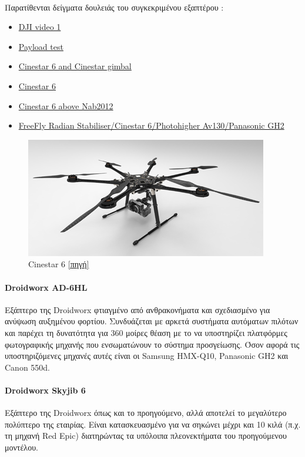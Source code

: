 \documentclass[a4paper, 12pt, twoside]{report}
\begin{document}
{{{{{{			\paragraph{}{Παρατίθενται δείγματα δουλειάς του συγκεκριμένου εξαπτέρου :
				\begin{itemize}
					\item \href{http://www.youtube.com/watch?v=Yo6Wdmt1zSU}{DJI video 1}
					\item \href{http://www.youtube.com/watch?v=t4ZkjpicWuo}{Payload test}
					\item \href{http://www.youtube.com/watch?v=fs1EynZ3E8o}{Cinestar 6 and Cinestar gimbal}
					\item \href{http://www.youtube.com/watch?v=J9hA6OfK9mE}{Cinestar 6}
					\item \href{http://www.youtube.com/watch?v=Bq6r-Ex6z98}{Cinestar 6 above Nab2012}
					\item \href{https://vimeo.com/47171190}{FreeFly Radian Stabiliser/Cinestar 6/Photohigher Av130/Panasonic GH2}
				\end{itemize}
			}
			\begin{figure}[hp]
					\centering
					\includegraphics[scale=0.50]{DJI_S800.png}
					\caption{Cinestar 6 \href{http://www.freeflysystems.com/images/products/cinestar-6-detail.png}{[πηγή]}}
					\label{φωτ:Cinestar 6}
			\end{figure}

			\paragraph{Droidworx AD-6HL}{Εξάπτερο της Droidworx φτιαγμένο από ανθρακονήματα και σχεδιασμένο για ανύψωση αυξημένου φορτίου. Συνδυάζεται με αρκετά συστήματα αυτόματων πιλότων και παρέχει τη δυνατότητα για 360 μοίρες θέαση με το να υποστηρίζει πλατφόρμες φωτογραφικής μηχανής που ενσωματώνουν το σύστημα προσγείωσης. Όσον αφορά τις υποστηριζόμενες μηχανές αυτές είναι οι Samsung HMX-Q10, Panasonic GH2 και Canon 550d. 
			}
			\paragraph{Droidworx Skyjib 6}{Εξάπτερο της Droidworx όπως και το προηγούμενο, αλλά αποτελεί το μεγαλύτερο πολύπτερο της εταιρίας. Είναι κατασκευασμένο για να σηκώνει μέχρι και 10 κιλά (π.χ. τη μηχανή Red Epic) διατηρώντας τα υπόλοιπα πλεονεκτήματα του προηγούμενου μοντέλου.
			}
}}}}}}
\end{document}
